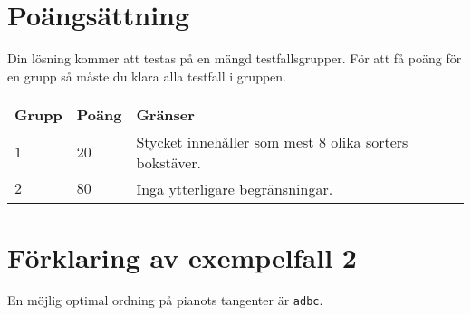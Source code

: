 \section*{Poängsättning}
Din lösning kommer att testas på en mängd testfallsgrupper.
För att få poäng för en grupp så måste du klara alla testfall i gruppen.

\noindent
\begin{tabular}{| l | l | p{12cm} |}
  \hline
  \textbf{Grupp} & \textbf{Poäng} & \textbf{Gränser} \\ \hline
  $1$    & $20$       & Stycket innehåller som mest $8$ olika sorters bokstäver. \\ \hline
  $2$    & $80$       & Inga ytterligare begränsningar. \\ \hline
\end{tabular}

\section*{Förklaring av exempelfall 2}

En möjlig optimal ordning på pianots tangenter är \texttt{adbc}.
